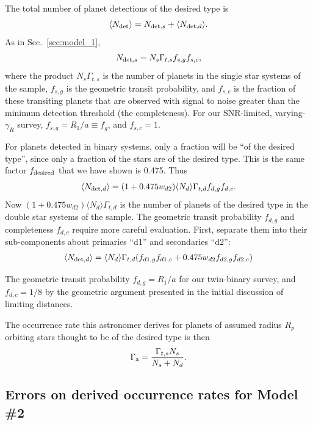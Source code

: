 \documentclass{emulateapj}
\begin{document}
The total number of planet detections of the desired type is 
\begin{equation}
\langle N_{\rm det}\rangle = 
N_{{\rm det},s} 
+ 
\langle N_{{\rm det},d}\rangle.
\end{equation}
As in Sec.~\ref{sec:model_1},
\begin{equation}
N_{{\rm det},s} = N_s \Gamma_{t,s} f_{s,g} f_{s,c},
\label{eq:N_det_s_model2}
\end{equation}
where the product $N_s \Gamma_{t,s}$ is the number of planets in the single 
star systems of the sample, $f_{s,g}$ is the geometric transit probability, 
and $f_{s,c}$ is the fraction of these transiting planets that are observed 
with signal to noise greater than the minimum detection threshold (the 
completeness). 
For our SNR-limited, varying-$\gamma_R$ survey, $f_{s,g} = R_1/a\equiv f_g$, 
and $f_{s,c}=1$.

For planets detected in binary systems, only a fraction will be ``of the 
desired type'', since only a fraction of the stars are of the desired type.
This is the same factor $f_{\rm desired}$ that we have shown is 0.475. Thus
\begin{equation}
\langle N_{{\rm det},d} \rangle
= 
(1+0.475w_{d2}) \langle N_d\rangle \Gamma_{t,d} f_{d,g} f_{d,c}.
\label{eq:N_det_d_model2}
\end{equation}
Now $(1+0.475w_{d2}) \langle N_d\rangle \Gamma_{t,d}$ is the number of 
planets of the desired type in the double star systems of the sample.
The geometric transit probability $f_{d,g}$ and completeness $f_{d,c}$ require 
more careful evaluation.
First, separate them into their sub-components about primaries ``d1'' and 
secondaries ``d2'':
\begin{align}
\langle N_{{\rm det},d} \rangle
= 
\langle N_d\rangle \Gamma_{t,d} ( f_{d1,g} f_{d1,c} 
+
0.475w_{d2}  f_{d2,g} f_{d2,c}
)
\end{align}


The geometric transit probability $f_{d,g}=R_1/a$ 
for our twin-binary survey, and $f_{d,c}=1/8$ by the geometric argument 
presented in the initial discussion of limiting distances.

The occurrence rate this astronomer derives for planets of assumed 
radius $R_p$ orbiting stars thought to be of the desired type is then
\begin{equation}
\Gamma_{\rm a} = \frac{\Gamma_{t,s}N_s}{N_s + N_d}.
\end{equation}


\subsection{Errors on derived occurrence rates for Model \#2}
\end{document}
